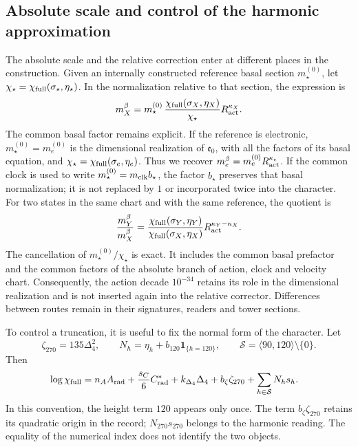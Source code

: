 \subsection{Absolute scale and control of the harmonic approximation}
\label{vi:subsec:vi-precision-torres}

The absolute scale and the relative correction enter at different
places in the construction. Given an internally constructed reference basal
section \(m_\star^{(0)}\), let
\(\chi_\star=\chi_{\rm full}(\sigma_\star,\eta_\star)\).
In the normalization relative to that section, the expression is
\[
 m_X^\beta=m_\star^{(0)}\,
 \frac{\chi_{\rm full}(\sigma_X,\eta_X)}{\chi_\star}
 R_{\rm act}^{\kappa_X}.
\]
The common basal factor remains explicit. If the reference is electronic,
\(m_\star^{(0)}=m_e^{(0)}\) is the dimensional realization of
\(\mathfrak e_0\), with all the factors of its basal equation, and
\(\chi_\star=\chi_{\rm full}(\sigma_e,\eta_e)\). Thus we recover
\(m_e^\beta=m_e^{(0)}R_{\rm act}^{\kappa_e}\). If the common clock is used
to write \(m_\star^{(0)}=m_{\rm clk}b_\star\), the
factor \(b_\star\) preserves that basal normalization; it is not replaced
by \(1\) or incorporated twice into the character. For two states
in the same chart and with the same reference, the quotient is
\[
 \frac{m_Y^\beta}{m_X^\beta}
 =\frac{\chi_{\rm full}(\sigma_Y,\eta_Y)}
        {\chi_{\rm full}(\sigma_X,\eta_X)}
     R_{\rm act}^{\kappa_Y-\kappa_X}.
\]
The cancellation of \(m_\star^{(0)}/\chi_\star\) is exact. It includes
the common basal prefactor and the common factors of the absolute branch of
action, clock and velocity chart. Consequently,
the action decade \(10^{-34}\) retains its role in
the dimensional realization and is not inserted again into the relative
corrector. Differences between routes remain in their signatures, readers
and tower sections.

To control a truncation, it is useful to fix the normal form of the character.
Let
\[
 \zeta_{270}=135\Delta_4^2,\qquad
 N_h=\eta_h+b_{120}\mathbf 1_{\{h=120\}},\qquad
 \mathcal S=\langle90,120\rangle\setminus\{0\}.
\]
Then
\[
\begin{split}
 \log\chi_{\rm full}
 ={}&n_AA_{\rm rad}+\frac{s_C}{6}C^*_{\rm rad}
       +k_{\Delta_4}\Delta_4+b_\zeta\zeta_{270}
       +\sum_{h\in\mathcal S}N_hs_h .
\end{split}
\]
In this convention, the height term \(120\) appears only once.
The term \(b_\zeta\zeta_{270}\) retains its quadratic origin in the
record; \(N_{270}s_{270}\) belongs to the harmonic reading. The
equality of the numerical index does not identify the two objects.

